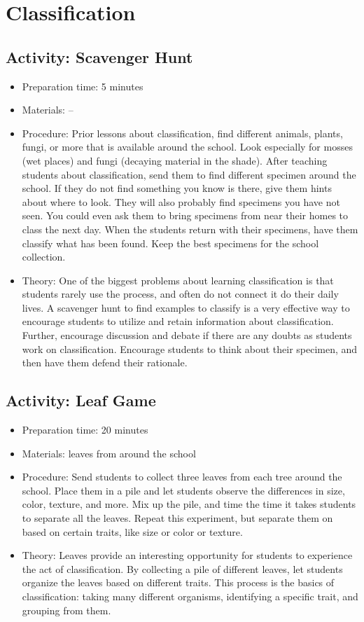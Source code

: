 \section{Classification}

\subsection{Activity: Scavenger Hunt}
\begin{itemize}
\item{Preparation time: 5 minutes}
\item{Materials: --}
\item{Procedure: Prior lessons about classification, find different animals, plants, fungi, or more that is available around the school. Look especially for mosses (wet places) and fungi (decaying material in the shade). After teaching students about classification, send them to find different specimen around the school. If they do not find something you know is there, give them hints about where to look. They will also probably find specimens you have not seen. You could even ask them to bring specimens from near their homes to class the next day. When the students return with their specimens, have them classify what has been found. Keep the best specimens for the school collection.}
\item{Theory: One of the biggest problems about learning classification is that students rarely use the process, and often do not connect it do their daily lives. A scavenger hunt to find examples to classify is a very effective way to encourage students to utilize and retain information about classification. Further, encourage discussion and debate if there are any doubts as students work on classification. Encourage students to think about their specimen, and then have them defend their rationale.}
\end{itemize}


\subsection{Activity: Leaf Game}
\begin{itemize}
\item{Preparation time: 20 minutes}
\item{Materials: leaves from around the school}
\item{Procedure: Send students to collect three leaves from each tree around the school. Place them in a pile and let students observe the differences in size, color, texture, and more. Mix up the pile, and time the time it takes students to separate all the leaves. Repeat this experiment, but separate them on based on certain traits, like size or color or texture.}
\item{Theory: Leaves provide an interesting opportunity for students to experience the act of classification. By collecting a pile of different leaves, let students organize the leaves based on different traits. This process is the basics of classification: taking many different organisms, identifying a specific trait, and grouping from them.}
\end{itemize}

